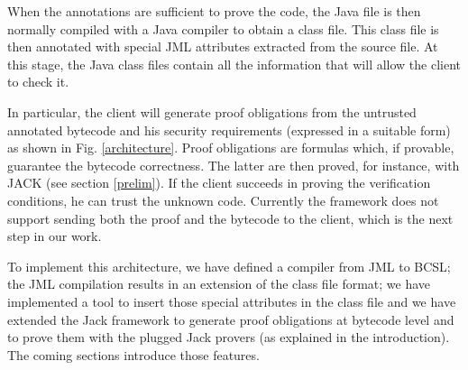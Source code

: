 When the annotations are sufficient to prove the code, 
the Java file is then normally compiled with a Java compiler to obtain a 
class file. 
This class file is then annotated with special JML attributes extracted from the source file. 
At this stage, the Java class files contain all the information that will allow the client to check it. 
 
In particular, the client will generate proof obligations from the untrusted annotated bytecode and his security requirements 
(expressed in a suitable form) as shown in Fig. \ref{architecture}. Proof obligations are formulas which, if provable, guarantee the bytecode correctness.
The latter are then proved, for instance, with JACK (see section \ref{prelim}). If the client succeeds in proving 
the verification conditions, he can trust the unknown code. Currently the framework does not support sending both the proof and the 
bytecode to the client, which is the next step in our work.

To implement this architecture, we have defined a compiler from JML to BCSL; the JML compilation results in an extension of the class file format; 
we have implemented a tool to insert those special attributes in the class file and we have extended the Jack framework to generate proof obligations at bytecode 
level and to prove them with the plugged Jack provers (as explained in the introduction). 
The coming sections introduce those features.  

